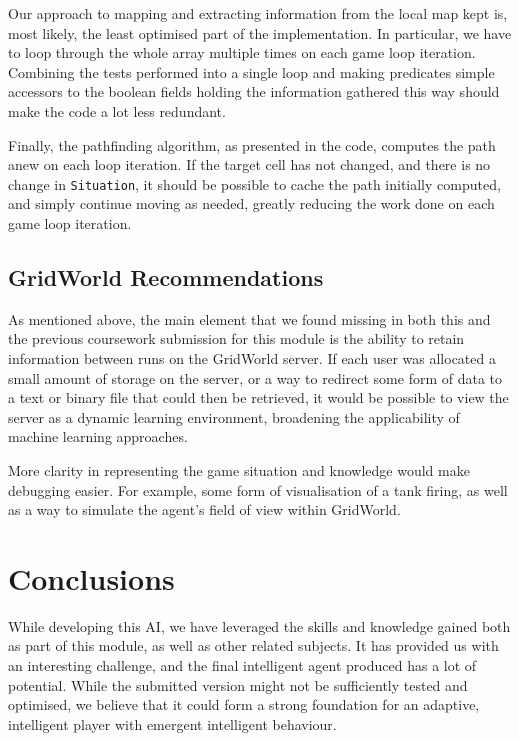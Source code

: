 \documentclass[11pt]{article}
\begin{document}
Our approach to mapping and extracting information from the local map kept is, most likely, the least optimised part of the implementation. In particular, we have to loop through the whole array multiple times on each game loop iteration. Combining the tests performed into a single loop and making predicates simple accessors to the boolean fields holding the information gathered this way should make the code a lot less redundant.

Finally, the pathfinding algorithm, as presented in the code, computes the path anew on each loop iteration. If the target cell has not changed, and there is no change in \verb|Situation|, it should be possible to cache the path initially computed, and simply continue moving as needed, greatly reducing the work done on each game loop iteration.

\subsection{GridWorld Recommendations}
As mentioned above, the main element that we found missing in both this and the previous coursework submission for this module is the ability to retain information between runs on the GridWorld server. If each user was allocated a small amount of storage on the server, or a way to redirect some form of data to a text or binary file that could then be retrieved, it would be possible to view the server as a dynamic learning environment, broadening the applicability of machine learning approaches.

More clarity in representing the game situation and knowledge would make debugging easier. For example, some form of visualisation of a tank firing, as well as a way to simulate the agent's field of view within GridWorld.

\section{Conclusions}
While developing this AI, we have leveraged the skills and knowledge gained both as part of this module, as well as other related subjects. It has provided us with an interesting challenge, and the final intelligent agent produced has a lot of potential. While the submitted version might not be sufficiently tested and optimised, we believe that it could form a strong foundation for an adaptive, intelligent player with emergent intelligent behaviour.

\newpage
{}


\end{document}
